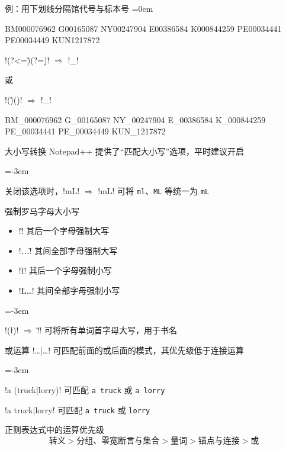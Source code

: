 \documentclass{beamer}
\makeatletter
\def\mymikudark#1{{\color{beamer@blendedblue}#1}}
\newcommand{\txt}[1]{\mymikudark{\texttt{#1}}}
\def\replace{{\color{black} $\Rightarrow$ }}
\def\npp{Notepad++}
\def\source{Source}
\def\target{Target}
\newenvironment{igsimple}%
	{\begin{description*}\leftskip=-3em\relax\item[例：\kern-1ex]}%
	{\end{description*}}
\makeatother
\begin{document}
\begin{frame}[fragile]{例：用下划线分隔馆代号与标本号}
	\parindent=0em
	\hbox{}\hfill
	\begin{minipage}[c]{15.5ex}
		\begin{YVerb}[label=\source]
			BM000076962
			G00165087
			NY00247904
			E00386584
			K000844259
			PE00034441
			PE00034449
			KUN1217872
		\end{YVerb}
	\end{minipage}%
	\hfill
	\begin{minipage}[c]{27ex}
		\centering
		!(?<=\u)(?=\d)! \replace !_!\par
		或\par
		!(\u)(\d)! \replace !\1_\2!
	\end{minipage}\quad%
	\hfill
	\begin{minipage}[c]{16.5ex}
		\begin{YVerb}[label=\target]
			BM_000076962
			G_00165087
			NY_00247904
			E_00386584
			K_000844259
			PE_00034441
			PE_00034449
			KUN_1217872
		\end{YVerb}
	\end{minipage}%
	\hfill\hbox{}\par
\end{frame}

\begin{frame}[fragile]{大小写转换}
	\npp{} 提供了“匹配大小写”选项，平时建议开启\par
	\begin{igsimple}
		关闭该选项时，!\<mL\>! \replace !mL! 可将 \txt{ml}、\txt{ML} 等统一为 \txt{mL}
	\end{igsimple}
	强制罗马字母大小写
	\begin{itemize}
		\item !\u! 其后一个字母强制大写
		\item !\U…\E! 其间全部字母强制大写
		\item !\l! 其后一个字母强制小写
		\item !\L…\E! 其间全部字母强制小写
	\end{itemize}\par
	\begin{igsimple}
		!\<(\l)! \replace !\u\1! 可将所有单词首字母大写，用于书名
	\end{igsimple}
\end{frame}

\begin{frame}[fragile]{或运算}
	!…|…! 可匹配前面的或后面的模式，其优先级低于连接运算\par
	\begin{igsimple}
		!a (truck|lorry)! 可匹配 \txt{a truck} 或 \txt{a lorry}\par
		!a truck|lorry! 可匹配 \txt{a truck} 或 \txt{lorry}
	\end{igsimple}\par
	正则表达式中的运算优先级
	$$\mbox{转义}>\mbox{分组、零宽断言与集合}>\mbox{量词}>\mbox{锚点与连接}>\mbox{或}$$
\end{frame}
\end{document}

